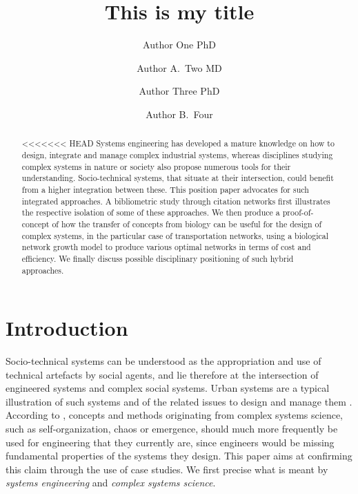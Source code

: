 \documentclass[alpha-refs]{wiley-article}
\title{This is my title}
\author[1\authfn{1}]{Author One PhD}
\author[2\authfn{1}]{Author A.~Two MD}
\author[2\authfn{2}]{Author Three PhD}
\author[2]{Author B.~Four}
\affil[1]{Department, Institution, City, State or Province, Postal Code, Country}
\affil[2]{Department, Institution, City, State or Province, Postal Code, Country}
\begin{document}
\maketitle

\begin{abstract}
<<<<<<< HEAD
Systems engineering has developed a mature knowledge on how to design, integrate and manage complex industrial systems, whereas disciplines studying complex systems in nature or society also propose numerous tools for their understanding. Socio-technical systems, that situate at their intersection, could benefit from a higher integration between these. This position paper advocates for such integrated approaches. A bibliometric study through citation networks first illustrates the respective isolation of some of these approaches. We then produce a proof-of-concept of how the transfer of concepts from biology can be useful for the design of complex systems, in the particular case of transportation networks, using a biological network growth model to produce various optimal networks in terms of cost and efficiency. We finally discuss possible disciplinary positioning of such hybrid approaches.
\end{abstract}



\cite{arcaute202future}

\cite{bar2003systems}



\section{Introduction}



Socio-technical systems can be understood as the appropriation and use of technical artefacts by social agents, and lie therefore at the intersection of engineered systems and complex social systems. Urban systems are a typical illustration of such systems and of the related issues to design and manage them \cite{portugali2012complexity}. According to \cite{sheard2009principles}, concepts and methods originating from complex systems science, such as self-organization, chaos or emergence, should much more frequently be used for engineering that they currently are, since engineers would be missing fundamental properties of the systems they design. This paper aims at confirming this claim through the use of case studies. We first precise what is meant by \emph{systems engineering} and \emph{complex systems science}.
\end{document}
